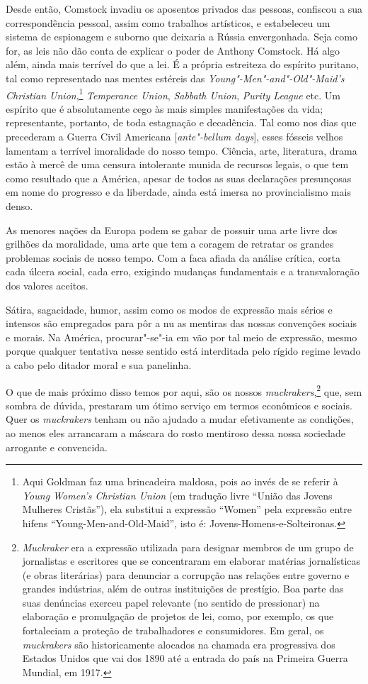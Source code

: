 Desde então, Comstock invadiu os aposentos privados das pessoas,
confiscou a sua correspondência pessoal, assim como trabalhos
artísticos, e estabeleceu um sistema de espionagem e suborno que
deixaria a Rússia envergonhada. Seja como for, as leis não dão conta de
explicar o poder de Anthony Comstock. Há algo além, ainda mais terrível
do que a lei. É a própria estreiteza do espírito puritano, tal como
representado nas mentes estéreis das \emph{Young"-Men"-and"-Old"-Maid's
Christian Union},\footnote{Aqui Goldman
  faz uma brincadeira maldosa, pois ao invés de se referir à
  \emph{Young Women's Christian Union} (em tradução livre ``União das Jovens Mulheres Cristãs''), ela substitui a expressão ``Women'' pela expressão entre hifens ``Young-Men-and-Old-Maid'', isto é: Jovens-Homens-e-Solteironas.} \emph{Temperance Union}, \emph{Sabbath Union},
\emph{Purity League} etc. Um espírito que é absolutamente cego às mais
simples manifestações da vida; representante, portanto, de toda
estagnação e decadência. Tal como nos dias que precederam a Guerra Civil
Americana {[}\emph{ante"-bellum days}{]}, esses fósseis velhos lamentam a
terrível imoralidade do nosso tempo. Ciência, arte, literatura, drama
estão à mercê de uma censura intolerante munida de recursos legais, o
que tem como resultado que a América, apesar de todos as suas
declarações presunçosas em nome do progresso e da liberdade, ainda está
imersa no provincialismo mais denso.

As menores nações da Europa podem se gabar de possuir uma arte livre dos
grilhões da moralidade, uma arte que tem a coragem de retratar os
grandes problemas sociais de nosso tempo. Com a faca afiada da análise
crítica, corta cada úlcera social, cada erro, exigindo mudanças
fundamentais e a transvaloração dos valores aceitos.

Sátira, sagacidade, humor, assim como os modos de expressão mais sérios
e intensos são empregados para pôr a nu as mentiras das nossas
convenções sociais e morais. Na América, procurar"-se"-ia em vão por tal
meio de expressão, mesmo porque qualquer tentativa nesse sentido está
interditada pelo rígido regime levado a cabo pelo ditador moral e sua
panelinha.

O que de mais próximo disso temos por aqui, são os nossos
\emph{muckrakers},\footnote{\emph{Muckraker} era a expressão utilizada
  para designar membros de um grupo de jornalistas e escritores que
  se concentraram em elaborar matérias jornalísticas (e obras
  literárias) para denunciar a corrupção nas relações entre governo e
  grandes indústrias, além de outras instituições de prestígio. Boa
  parte das suas denúncias exerceu papel relevante (no sentido de
  pressionar) na elaboração e promulgação de projetos de lei, como, por
  exemplo, os que fortaleciam a proteção de trabalhadores e
  consumidores. Em geral, os \emph{muckrakers} são historicamente
  alocados na chamada era progressiva dos Estados Unidos que vai dos
  1890 até a entrada do país na Primeira Guerra Mundial, em 1917.} que,
sem sombra de dúvida, prestaram um ótimo serviço em termos econômicos e
sociais. Quer os \emph{muckrakers} tenham ou não ajudado a mudar
efetivamente as condições, ao menos eles arrancaram a máscara do rosto
mentiroso dessa nossa sociedade arrogante e convencida.

